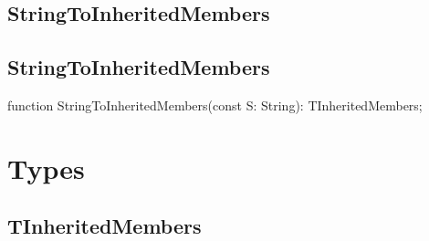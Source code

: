 \documentclass{report}
\newif\ifpdf
\begin{document}
\subsection*{\large{\textbf{StringToInheritedMembers}}\normalsize\hspace{1ex}\hrulefill}
\else
\subsection*{StringToInheritedMembers}
\fi
\label{PasDoc_GenHtml-StringToInheritedMembers}
\begin{list}{}{
\setlength{\itemindent}{0cm}
\setlength{\listparindent}{0cm}
\setlength{\leftmargin}{\evensidemargin}
\addtolength{\leftmargin}{\tmplength}
\settowidth{\labelsep}{X}
\addtolength{\leftmargin}{\labelsep}
\setlength{\labelwidth}{\tmplength}
}
\item[\textbf{Declaration}\hfill]
\ifpdf
\begin{flushleft}
\fi
\begin{ttfamily}
function StringToInheritedMembers(const S: String): TInheritedMembers;\end{ttfamily}

\ifpdf
\end{flushleft}
\fi

\end{list}
\section{Types}
\ifpdf
\subsection*{\large{\textbf{TInheritedMembers}}\normalsize\hspace{1ex}\hrulefill}
\else
\end{document}
